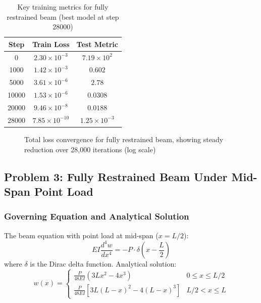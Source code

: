 \documentclass[12pt]{article}
\begin{document}
\begin{table}[htbp]
	\centering
	\begin{tabular}{c c c}
		\toprule
		\textbf{Step} & \textbf{Train Loss} & \textbf{Test Metric} \\
		\midrule
		0 & $2.30 \times 10^{-3}$ & $7.19 \times 10^{2}$ \\
		1000 & $1.42 \times 10^{-3}$ & $0.602$ \\
		5000 & $3.61 \times 10^{-6}$ & $2.78$ \\
		10000 & $1.53 \times 10^{-6}$ & $0.0308$ \\
		20000 & $9.46 \times 10^{-8}$ & $0.0188$ \\
		28000 & $7.85 \times 10^{-10}$ & $1.25 \times 10^{-3}$ \\
		\bottomrule
	\end{tabular}
	\caption{Key training metrics for fully restrained beam (best model at step 28000)}
\end{table}

\begin{figure}[htbp]
	\centering
	\caption{Total loss convergence for fully restrained beam, showing steady reduction over 28,000 iterations (log scale)}
	\label{fig:restrained_convergence}
\end{figure}

\subsection{Problem 3: Fully Restrained Beam Under Mid-Span Point Load}
\subsubsection{Governing Equation and Analytical Solution}
The beam equation with point load at mid-span ($x = L/2$):
\begin{equation}
	EI \frac{d^4 w}{dx^4} = -P \cdot \delta\left(x - \frac{L}{2}\right)
	\label{eq:point_load_pde}
\end{equation}
where $\delta$ is the Dirac delta function. Analytical solution:
\begin{equation}
	w(x) = 
	\begin{cases} 
		\frac{P}{48EI}(3Lx^2 - 4x^3) & 0 \leq x \leq L/2 \\
		\frac{P}{48EI}[3L(L-x)^2 - 4(L-x)^3] & L/2 < x \leq L 
	\end{cases}
	\label{eq:point_load_solution}
\end{equation}
\end{document}
